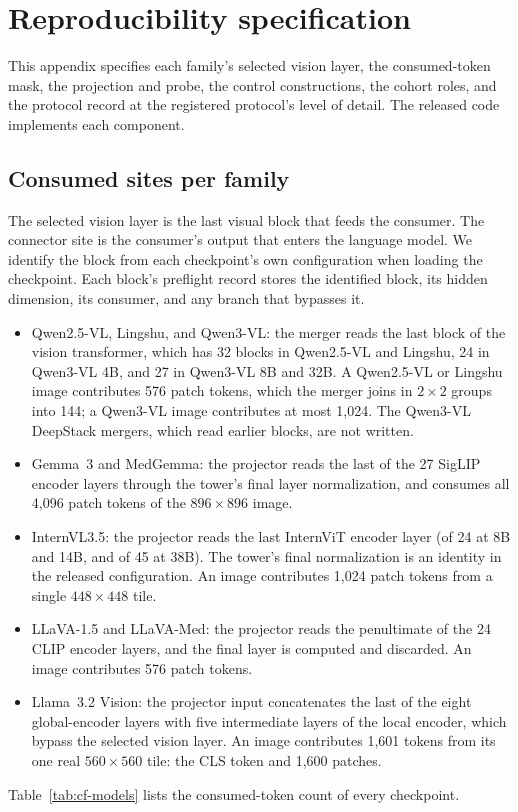 \documentclass[11pt]{article}
\begin{document}
\section{Reproducibility specification}
\label{app:repro}

This appendix specifies each family's selected vision layer, the consumed-token mask, the projection and probe, the control constructions, the cohort roles, and the protocol record at the registered protocol's level of detail. The released code implements each component.

\subsection{Consumed sites per family}
\label{app:repro-sites}

The selected vision layer is the last visual block that feeds the consumer. The connector site is the consumer's output that enters the language model. We identify the block from each checkpoint's own configuration when loading the checkpoint. Each block's preflight record stores the identified block, its hidden dimension, its consumer, and any branch that bypasses it.

\begin{itemize}[leftmargin=*,itemsep=1pt,topsep=2pt]
\item Qwen2.5-VL, Lingshu, and Qwen3-VL: the merger reads the last block of the vision transformer, which has 32 blocks in Qwen2.5-VL and Lingshu, 24 in Qwen3-VL 4B, and 27 in Qwen3-VL 8B and 32B. A Qwen2.5-VL or Lingshu image contributes 576 patch tokens, which the merger joins in $2\times2$ groups into 144; a Qwen3-VL image contributes at most 1{,}024. The Qwen3-VL DeepStack mergers, which read earlier blocks, are not written.
\item Gemma~3 and MedGemma: the projector reads the last of the 27 SigLIP encoder layers through the tower's final layer normalization, and consumes all 4{,}096 patch tokens of the $896\times896$ image.
\item InternVL3.5: the projector reads the last InternViT encoder layer (of 24 at 8B and 14B, and of 45 at 38B). The tower's final normalization is an identity in the released configuration. An image contributes 1{,}024 patch tokens from a single $448\times448$ tile.
\item LLaVA-1.5 and LLaVA-Med: the projector reads the penultimate of the 24 CLIP encoder layers, and the final layer is computed and discarded. An image contributes 576 patch tokens.
\item Llama~3.2 Vision: the projector input concatenates the last of the eight global-encoder layers with five intermediate layers of the local encoder, which bypass the selected vision layer. An image contributes 1{,}601 tokens from its one real $560\times560$ tile: the CLS token and 1{,}600 patches.
\end{itemize}
Table~\ref{tab:cf-models} lists the consumed-token count of every checkpoint.
\end{document}
